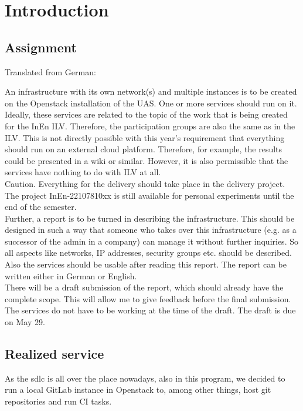 \chapter{Introduction}

\section{Assignment}
Translated from German:

An infrastructure with its own network(s) and multiple instances is to be created on the Openstack installation of the UAS.
One or more services should run on it.
Ideally, these services are related to the topic of the work that is being created for the InEn ILV.
Therefore, the participation groups are also the same as in the ILV.
This is not directly possible with this year's requirement that everything should run on an external cloud platform.
Therefore, for example, the results could be presented in a wiki or similar.
However, it is also permissible that the services have nothing to do with ILV at all.\\

Caution. Everything for the delivery should take place in the delivery project.
The project InEn-22107810xx is still available for personal experiments until the end of the semester.\\

Further, a report is to be turned in describing the infrastructure.
This should be designed in such a way that someone who takes over this infrastructure (e.g. as a successor of the admin in a company) can manage it without further inquiries.
So all aspects like networks, IP addresses, security groups etc. should be described.
Also the services should be usable after reading this report.
The report can be written either in German or English.\\

There will be a draft submission of the report, which should already have the complete scope.
This will allow me to give feedback before the final submission.
The services do not have to be working at the time of the draft.
The draft is due on May 29.

\section{Realized service}
As the \ac{sdlc} is all over the place nowadays, also in this program, we decided to run a local GitLab instance in Openstack to, among other things, host git repositories and run CI tasks.
